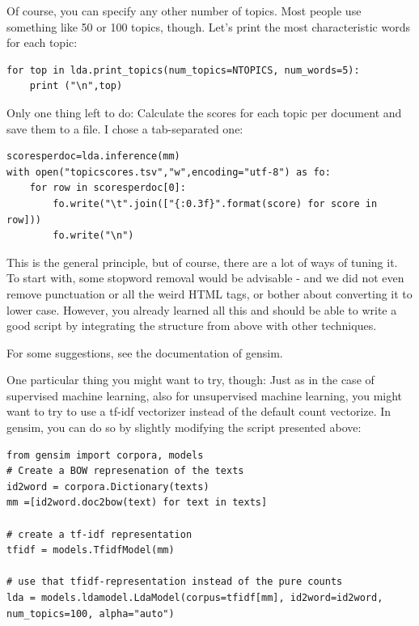 \documentclass[a4paper,12pt]{book}
\begin{document}
Of course, you can specify any other number of topics. Most people use something like 50 or 100 topics, though. Let's print the most characteristic words for each topic:

\begin{lstlisting}
for top in lda.print_topics(num_topics=NTOPICS, num_words=5):
    print ("\n",top)

\end{lstlisting}

Only one thing left to do: Calculate the scores for each topic per document and save them to a file. I chose a tab-separated one:

\begin{lstlisting}
scoresperdoc=lda.inference(mm)
with open("topicscores.tsv","w",encoding="utf-8") as fo:
    for row in scoresperdoc[0]:
        fo.write("\t".join(["{:0.3f}".format(score) for score in row]))
        fo.write("\n")
\end{lstlisting}

This is the general principle, but of course, there are a lot of ways of tuning it. To start with, some stopword removal would be advisable - and we did not even remove punctuation or all the weird HTML tags, or bother about converting it to lower case. However, you already learned all this and should be able to write a good script by integrating the structure from above with other techniques.

For some suggestions, see the documentation of gensim.%

One particular thing you might want to try, though: Just as in the case of supervised machine learning, also for unsupervised machine learning, you might want to try to use a tf-idf vectorizer instead of the default count vectorize. In gensim, you can do so by slightly modifying the script presented above:


\begin{lstlisting}
from gensim import corpora, models
# Create a BOW represenation of the texts
id2word = corpora.Dictionary(texts)
mm =[id2word.doc2bow(text) for text in texts]

# create a tf-idf representation
tfidf = models.TfidfModel(mm)

# use that tfidf-representation instead of the pure counts
lda = models.ldamodel.LdaModel(corpus=tfidf[mm], id2word=id2word, num_topics=100, alpha="auto")
\end{lstlisting}
\end{document}
